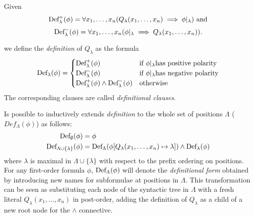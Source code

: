 Given 
  \[\fldef{\lambda}[+]{\phi} = \forall x_1, \ldots, x_n(Q_\lambda(x_1,\ldots,x_n)\implies \phi|_\lambda) \text{ and}\]
  \[\fldef{\lambda}[-]{\phi} = \forall x_1, \ldots, x_n(\phi|_\lambda \implies Q_\lambda(x_1,\ldots,x_n)).\]

we define the \emph{definition} of \(Q_\lambda\) as the formula
\begin{equation}
  \fldef{\lambda}{\phi} = \begin{cases}
                        \fldef{\lambda}[+]{\phi} & \text{if } \phi|_\lambda \text{has positive polarity}\\
                        \fldef{\lambda}[-]{\phi} & \text{if } \phi|_\lambda \text{has negative polarity}\\
                        \fldef{\lambda}[+]{\phi} \land \fldef{\lambda}[-]{\phi} & \text{otherwise}
                      \end{cases}
\end{equation}
The corresponding clauses are called \emph{definitional clauses}.

Is possible to inductively extends \emph{definition} to the whole set of positions \(\Lambda\) (\(Def_\Lambda(\phi)\)) as follows:
\begin{equation}
  \begin{aligned}
    \fldef{\emptyset}{\phi} &= \phi\\
    \fldef{\Lambda\cup\{\lambda\}}{\phi} &= \fldef{\Lambda}{\phi[Q_\lambda(x_1,\ldots,x_n)\mapsto\lambda]} \land \fldef{\lambda}{\phi}
  \end{aligned}
\end{equation}
\indent where \(\lambda\) is maximal in \(\Lambda\cup\{\lambda\}\) with respect to the prefix ordering on positions.
For any first-order formula \(\phi\), \(\fldef{\Lambda}{\phi}\) will denote the \emph{definitional form} obtained by introducing new names for subformulae at positions in \(\Lambda\).
This transformation can be seen as substituting each node of the syntactic tree in \(\Lambda\) with a fresh literal \(Q_\lambda(x_1,\ldots,x_n)\) in post-order, adding the definition of \(Q_\lambda\) as a child of a new root node for the \(\land\) connective.

